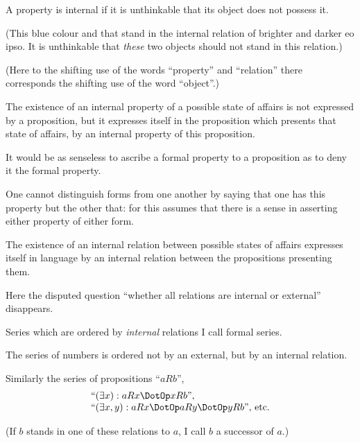 {A property is internal if it is unthinkable that
its object does not possess it.

(This blue colour and that stand in the internal
relation of brighter and darker eo ipso. It is
unthinkable that \emph{these} two objects should not stand
in this relation.)

(Here to the shifting use of the words ``property''
and ``relation'' there corresponds the shifting use
of the word ``object''.)}


{The existence of an internal property of a possible
state of affairs is not expressed by a proposition,
but it expresses itself in the proposition which
presents that state of affairs, by an internal property
of this proposition.

It would be as senseless to ascribe a formal
property to a proposition as to deny it the formal
property.}


{One cannot distinguish forms from one another
by saying that one has this property but the other
that: for this assumes that there is a sense in asserting
either property of either form.}


{The existence of an internal relation between
possible states of affairs expresses itself in language
by an internal relation between the propositions
presenting them.}


{Here the disputed question ``whether all relations
are internal or external'' disappears.}


{Series which are ordered by \emph{internal} relations I
call formal series.

The series of numbers is ordered not by an
external, but by an internal relation.

Similarly the series of propositions ``$aRb$'',
\[
\begin{array}{l}
``(\exists x) : aRx \DotOp xRb\text{'',}\\
``(\exists x,y) : aRx \DotOp aRy \DotOp yRb\text{'', etc.}
\end{array}
\]

(If $b$ stands in one of these relations to $a$, I call
$b$ a successor of $a$.)}


